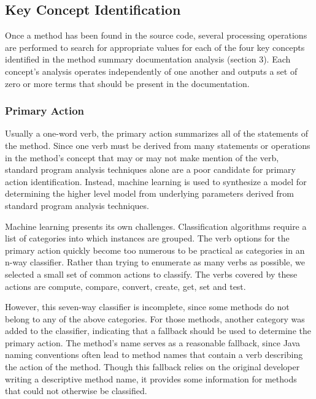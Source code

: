 \documentclass[preprint]{sigplanconf}
\begin{document}
\subsection{Key Concept Identification}
Once a method has been found in the source code, several processing operations are performed to search for appropriate values for each of the four key concepts identified in the method summary documentation analysis (section 3). Each concept's analysis operates independently of one another and outputs a set of zero or more terms that should be present in the documentation.

\subsubsection{Primary Action}
Usually a one-word verb, the primary action summarizes all of the statements of the method. Since one verb must be derived from many statements or operations in the method's concept that may or may not make mention of the verb, standard program analysis techniques alone are a poor candidate for primary action identification. Instead, machine learning is used to synthesize a model for determining the higher level model from underlying parameters derived from standard program analysis techniques.

Machine learning presents its own challenges. Classification algorithms require a list of categories into which instances are grouped. The verb options for the primary action quickly become too numerous to be practical as categories in an n-way classifier. Rather than trying to enumerate as many verbs as possible, we selected a small set of common actions to classify. The verbs covered by these actions are compute, compare, convert, create, get, set and test.

However, this seven-way classifier is incomplete, since some methods do not belong to any of the above categories. For those methods, another category was added to the classifier, indicating that a fallback should be used to determine the primary action. The method's name serves as a reasonable fallback, since Java naming conventions often lead to method names that contain a verb describing the action of the method. Though this fallback relies on the original developer writing a descriptive method name, it provides some information for methods that could not otherwise be classified.
\end{document}
